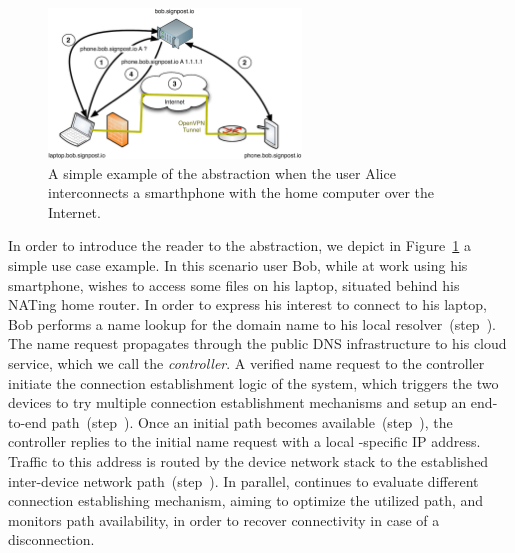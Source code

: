 \begin{figure}[ht]
  \begin{center}
	\includegraphics[width=0.6\textwidth]{Chapter3/Chapter3Figs/sp-illustration}
  \end{center}
  \caption{A simple example of the \signpost abstraction when the user Alice
    interconnects a smarthphone with the home computer over the Internet.}
  \label{fig:signpost-user-abstraction}
\end{figure}

In order to introduce the reader to the \signpost abstraction, we depict in
Figure~\ref{fig:signpost-user-abstraction} a simple use case example.
In this scenario user Bob, while at work using his smartphone,
wishes to access some files on his laptop, situated behind his NATing home
router. In order to express his interest to connect to his laptop, Bob performs
a name lookup for the domain name  to his local \signpost
resolver~(step~).  The name request propagates through the public DNS
infrastructure to his \signpost cloud service, which we call the {\it \signpost
  controller}. A verified name request to the \signpost controller initiate the
connection establishment logic of the system, which triggers the two devices to
try multiple connection establishment mechanisms and setup an
end-to-end path~(step~). Once an initial path becomes
available~(step~), the controller replies to the initial name request
with a local \signpost-specific IP address. Traffic to this address is routed by
the device network stack to the established inter-device network
path~(step~).  In parallel, \signpost continues to evaluate different
connection establishing mechanism, aiming to optimize the utilized path, and
monitors path availability, in order to recover connectivity in case of
a disconnection. 


